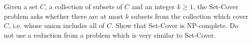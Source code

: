 \problem{}

Given a set $C$, a collection of subsets of $C$ and an integer $k \geq 1$, the Set-Cover problem asks whether there are at most $k$ subsets from the collection which cover $C$, i.e. whose union includes all of $C$. Show that Set-Cover is NP-complete. Do not use a reduction from a problem which is very similar to Set-Cover.

\solution{}





\newpage